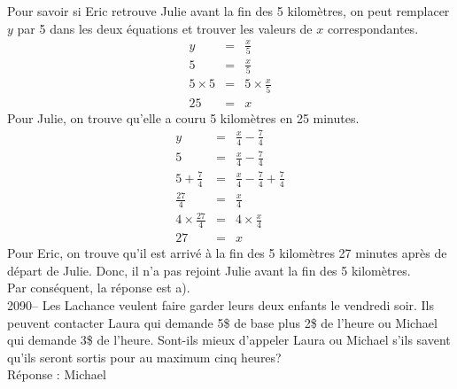 \documentclass[letterpaper, 12pt]{article}
\begin{document}
Pour savoir si Eric retrouve Julie avant la fin des 5 kilom\`etres, on peut remplacer $y$ par 5 dans les deux \'equations et trouver les valeurs de $x$ correspondantes.
\begin{eqnarray*}
y&=&\frac{x}{5}\\[2mm]
5&=&\frac{x}{5}\\[2mm]
5\times 5&=&5\times \frac{x}{5}\\[2mm]
25&=&x
\end{eqnarray*}
Pour Julie, on trouve qu'elle a couru 5 kilom\`etres en 25 minutes.
\begin{eqnarray*}
y&=&\frac{x}{4}-\frac{7}{4}\\[2mm]
5&=&\frac{x}{4}-\frac{7}{4}\\[2mm]
5+\frac{7}{4}&=&\frac{x}{4}-\frac{7}{4}+\frac{7}{4}\\[2mm]
\frac{27}{4}&=&\frac{x}{4}\\[2mm]
4\times \frac{27}{4}&=&4\times \frac{x}{4}\\[2mm]
27&=&x
\end{eqnarray*}
Pour Eric, on trouve qu'il est arriv\'e \`a la fin des 5 kilom\`etres 27 minutes apr\`es de d\'epart de Julie. Donc, il n'a pas rejoint Julie avant la fin des 5 kilom\`etres.\\
Par cons\'equent, la r\'eponse est a).\\


2090-- Les Lachance veulent faire garder leurs deux enfants le vendredi soir. Ils peuvent contacter Laura qui demande 5\$ de base plus 2\$ de l'heure ou Michael qui demande 3\$ de l'heure. Sont-ils mieux d'appeler Laura ou Michael s'ils savent qu'ils seront sortis pour au maximum cinq heures?\\

R\'eponse : Michael\\
\end{document}
